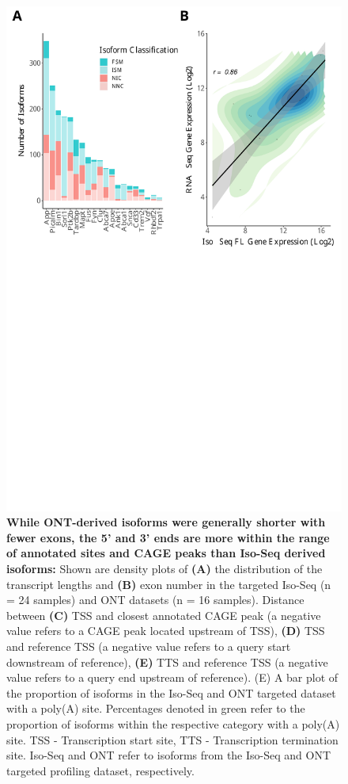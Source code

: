 \begin{figure}[!htp]
	\begin{center}
		\includegraphics[page=3,trim={0 9cm 0 0cm},clip,scale = 0.60]{Figures/ONTvsIsoSeq.pdf}
	\end{center}
	\captionsetup{width=0.95\textwidth}
	\caption[Comparison of ONT-derived and Iso-Seq-derived isoforms for targeted transcriptome profiling]%
	{\textbf{While ONT-derived isoforms were generally shorter with fewer exons, the 5' and 3' ends are more within the range of annotated sites and CAGE peaks than Iso-Seq derived isoforms:} Shown are density plots of \textbf{(A)} the distribution of the transcript lengths and \textbf{(B)} exon number in the targeted Iso-Seq (n = 24 samples) and ONT datasets (n = 16 samples). Distance between \textbf{(C)} TSS and closest annotated CAGE peak (a negative value refers to a CAGE peak located upstream of TSS), \textbf{(D)} TSS and reference TSS (a negative value refers to a query start downstream of reference), \textbf{(E)} TTS and reference TSS (a negative value refers to a query end upstream of reference). {(E)} A bar plot of the proportion of isoforms in the Iso-Seq and ONT targeted dataset with a poly(A) site. Percentages denoted in green refer to the proportion of isoforms within the respective category with a poly(A) site. TSS - Transcription start site, TTS - Transcription termination site. Iso-Seq and ONT refer to isoforms from the Iso-Seq and ONT targeted profiling dataset, respectively.}

\end{figure}
